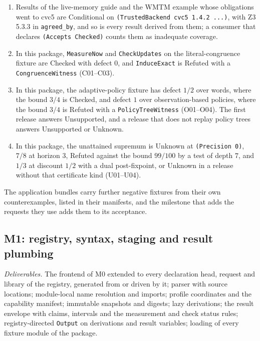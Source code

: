 \documentclass[11pt]{article}
\newcommand{\code}[1]{\texttt{#1}}
\begin{document}
\begin{enumerate}
a new estimate or a declared argument on a fixed population. The example's oracle computes the
counterexample on its own receipts: a policy that withheld every key that is not a duplicate and
none that is would propose a subset of the keys of the log-only phase, all of them duplicates. The
same oracle checks the argument that carries the bound over to the example's snooze release, under
which every key is first proposed at the same cycle as before.
\item Results of the live-memory guide and the WMTM example whose obligations went to cvc5 are
Conditional on \code{(TrustedBackend cvc5 1.4.2 ...)}, with Z3 5.3.3 in \code{agreed\_by}, and so is
every result derived from them; a consumer that declares \code{(Accepts Checked)} counts them as
inadequate coverage.
\item In this package, \code{MeasureNow} and \code{CheckUpdates} on the literal-congruence fixture are
Checked with defect $0$, and \code{InduceExact} is Refuted with a \code{CongruenceWitness}
(C01--C03).
\item In this package, the adaptive-policy fixture has defect $1/2$ over words, where the bound $3/4$
is Checked, and defect $1$ over observation-based policies, where the bound $3/4$ is Refuted with a
\code{PolicyTreeWitness} (O01--O04). The first release answers Unsupported, and a release that does
not replay policy trees answers Unsupported or Unknown.
\item In this package, the unattained supremum is Unknown at \code{(Precision 0)}, $7/8$ at horizon
$3$, Refuted against the bound $99/100$ by a test of depth $7$, and $1/3$ at discount $1/2$ with a
dual post-fixpoint, or Unknown in a release without that certificate kind (U01--U04).
\end{enumerate}
The application bundles carry further negative fixtures from their own counterexamples, listed in
their manifests, and the milestone that adds the requests they use adds them to its acceptance.

\subsection{M1: registry, syntax, staging and result plumbing}

\emph{Deliverables.} The frontend of M0 extended to every declaration head, request and library of
the registry, generated from or driven by it; parser with source
locations; module-local name resolution and imports; profile coordinates and the capability manifest;
immutable snapshots and digests; lazy derivations; the result envelope with claims, intervals and the
measurement and check status rules; registry-directed \code{Output} on derivations and result
variables; loading of every fixture module of the package.
\end{document}
